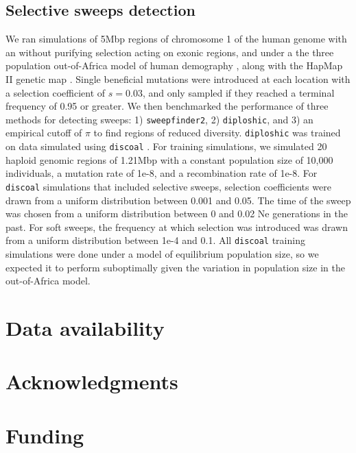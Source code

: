 \documentclass[hidelinks]{article}
\newcommand{\sweepfinder}{\texttt{sweepfinder2}\xspace}
\newcommand{\diploshic}{\texttt{diploshic}\xspace}
\begin{document}
    \subsection*{Selective sweeps detection}
    We ran simulations of 5Mbp regions of chromosome 1 of the human genome with an without
    purifying selection acting on exonic regions, and under a the three population
    out-of-Africa model of human demography \citep{gutenkunst2009inferring}, 
    along with the HapMap II genetic map \citep{international2007second}.
    Single beneficial mutations were introduced at each location with a selection coefficient of $s = 0.03$,
    and only sampled if they reached a terminal frequency of 0.95 or greater. 
    We then benchmarked the performance of three methods for detecting sweeps: 1) \sweepfinder \citep{degiorgio2016sweepfinder2},
    2) \diploshic \citep{kern2018diplos}, and 3) an empirical cutoff of $\pi$ to find regions of reduced diversity.
    \diploshic was trained on data simulated using \texttt{discoal} \citep{kern2016discoal}.
    For training simulations, we simulated 20 haploid genomic regions of 1.21Mbp
    with a constant population size of 10,000 individuals, a mutation rate of 1e-8, and a recombination rate of 1e-8.
    For \texttt{discoal} simulations that included selective sweeps,
    selection coefficients were drawn from a uniform distribution between 0.001 and 0.05.
    The time of the sweep was chosen from a uniform distribution between 0 and 0.02 Ne generations in the past.
    For soft sweeps, the frequency at which selection was introduced was drawn from a uniform distribution between 1e-4 and 0.1.
    All \texttt{discoal} training simulations were done under a model of equilibrium population size, 
    so we expected it to perform suboptimally given the variation in population size in the out-of-Africa model. 

\section*{Data availability}\label{data_availability}


\section*{Acknowledgments}\label{acknowledgements}

\section*{Funding}
    \label{funding}
\end{document}
